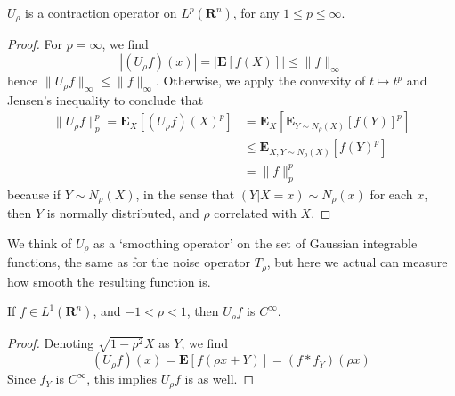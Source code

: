 \begin{theorem}
    $U_\rho$ is a contraction operator on $L^p(\mathbf{R}^n)$, for any $1 \leq p \leq \infty$.
\end{theorem}
\begin{proof}
    For $p = \infty$, we find
    \[ \left| (U_\rho f)(x) \right| = \left| \mathbf{E}[f(X)] \right| \leq \| f \|_\infty \]
    hence $\| U_\rho f \|_\infty \leq \| f \|_\infty$. Otherwise, we apply the convexity of $t \mapsto t^p$ and Jensen's inequality to conclude that
    \begin{align*}
        \| U_\rho f \|^p_p = \mathbf{E}_X[(U_\rho f)(X)^p] &= \mathbf{E}_X\left[ \mathbf{E}_{Y \sim N_\rho(X)}[f(Y)]^p \right]\\
        &\leq \mathbf{E}_{X, Y \sim N_\rho(X)}[f(Y)^p]\\
        &= \| f \|_p^p
    \end{align*}
    because if $Y \sim N_\rho(X)$, in the sense that $(Y|X = x) \sim N_\rho(x)$ for each $x$, then $Y$ is normally distributed, and $\rho$ correlated with $X$.
\end{proof}

We think of $U_\rho$ as a `smoothing operator' on the set of Gaussian integrable functions, the same as for the noise operator $T_\rho$, but here we actual can measure how smooth the resulting function is.

\begin{theorem}
    If $f \in L^1(\mathbf{R}^n)$, and $-1 < \rho < 1$, then $U_\rho f$ is $C^\infty$.
\end{theorem}
\begin{proof}
    Denoting $\sqrt{1 - \rho^2} X$ as $Y$, we find
    \[ (U_\rho f) \left( x \right) = \mathbf{E} \left[ f \left( \rho x + Y \right) \right] = (f * f_Y)(\rho x) \]
    Since $f_Y$ is $C^\infty$, this implies $U_\rho f$ is as well.
\end{proof}

